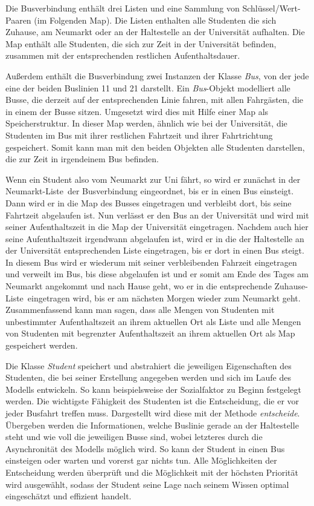 \documentclass[12pt,a4paper]{scrartcl}
\begin{document}
Die Busverbindung enthält drei Listen und eine Sammlung von Schlüssel/Wert-Paaren (im Folgenden Map). Die Listen enthalten alle Studenten die sich Zuhause, am Neumarkt oder an der Haltestelle an der Universität aufhalten. Die Map enthält alle Studenten, die sich zur Zeit in der Universität befinden, zusammen mit der entsprechenden restlichen Aufenthaltsdauer.

Außerdem enthält die Busverbindung zwei Instanzen der Klasse \textit{Bus}, von der jede eine der beiden Buslinien 11 und 21 darstellt. Ein \textit{Bus}-Objekt modelliert alle Busse, die derzeit auf der entsprechenden Linie fahren, mit allen Fahrgästen, die in einem der Busse sitzen. Umgesetzt wird dies mit Hilfe einer Map als Speicherstruktur. In dieser Map werden, ähnlich wie bei der Universität, die Studenten im Bus mit ihrer restlichen Fahrtzeit und ihrer Fahrtrichtung gespeichert. Somit kann man mit den beiden Objekten alle Studenten darstellen, die zur Zeit in irgendeinem Bus befinden.

Wenn ein Student also vom Neumarkt zur Uni fährt, so wird er zunächst in der \glqq Neumarkt-Liste\grqq~der Busverbindung eingeordnet, bis er in einen Bus einsteigt. Dann wird er in die Map des Busses eingetragen und verbleibt dort, bis seine Fahrtzeit abgelaufen ist. Nun verlässt er den Bus an der Universität und wird mit seiner Aufenthaltszeit in die Map der Universität eingetragen. Nachdem auch hier seine Aufenthaltszeit irgendwann abgelaufen ist, wird er in die der Haltestelle an der Universität entsprechenden Liste eingetragen, bis er dort in einen Bus steigt. In diesem Bus wird er wiederum mit seiner verbleibenden Fahrzeit eingetragen und verweilt im Bus, bis diese abgelaufen ist und er somit am Ende des Tages am Neumarkt angekommt und nach Hause geht, wo er in die entsprechende \glqq Zuhause-Liste\grqq~eingetragen wird, bis er am nächsten Morgen wieder zum Neumarkt geht. Zusammenfassend kann man sagen, dass alle Mengen von Studenten mit unbestimmter Aufenthaltszeit an ihrem aktuellen Ort als Liste und alle Mengen von Studenten mit begrenzter Aufenthaltszeit an ihrem aktuellen Ort als Map gespeichert werden.

Die Klasse \textit{Student} speichert und abstrahiert die jeweiligen Eigenschaften des Studenten, die bei seiner Erstellung angegeben werden und sich im Laufe des Modells entwickeln. So kann beispielsweise der Sozialfaktor zu Beginn festgelegt werden. Die wichtigste Fähigkeit des Studenten ist die Entscheidung, die er vor jeder Busfahrt treffen muss. Dargestellt wird diese mit der Methode \textit{entscheide}. Übergeben werden die Informationen, welche Buslinie gerade an der Haltestelle steht und wie voll die jeweiligen Busse sind, wobei letzteres durch die Asynchronität des Modells möglich wird. So kann der Student in einen Bus einsteigen oder warten und vorerst gar nichts tun. Alle Möglichkeiten der Entscheidung werden überprüft und die Möglichkeit mit der höchsten Priorität wird ausgewählt, sodass der Student seine Lage nach seinem Wissen optimal eingeschätzt und effizient handelt. 
\end{document}
